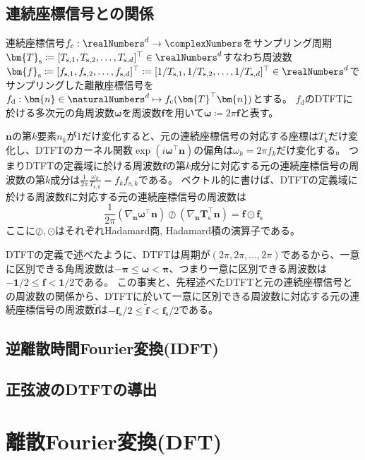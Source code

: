 			\section{連続座標信号との関係}
				連続座標信号$f_\text{c}:\realNumbers^d\to\complexNumbers$をサンプリング周期$\bm{T}_\text{s} \coloneqq [T_{\text{s},1}, T_{\text{s},2}, \dotsc, T_{\text{s},d}]^\top\in\realNumbers^d$すなわち周波数$\bm{f}_\text{s} \coloneqq [f_{\text{s},1}, f_{\text{s},2}, \dotsc, f_{\text{s},d}]^\top \coloneqq [1/T_{\text{s},1}, 1/T_{\text{s},2}, \dotsc, 1/T_{\text{s},d}]^\top\in\realNumbers^d$でサンプリングした離散座標信号を$f_\text{d}: \bm{n}\in\naturalNumbers^d\mapsto f_\text{c}(\bm{T}^\top\bm{n})$とする。
				$f_\text{d}$のDTFTに於ける多次元の角周波数$\bm{\omega}$を周波数$\bm{f}$を用いて$\bm{\omega} \coloneqq 2\pi\bm{f}$と表す。
				\par
				$\bm{n}$の第$k$要素$n_k$が1だけ変化すると、元の連続座標信号の対応する座標は$T_k$だけ変化し、DTFTのカーネル関数$\exp(i\bm{\omega}^\top\bm{n})$の偏角は$\omega_k = 2\pi f_k$だけ変化する。
				つまりDTFTの定義域に於ける周波数$\bm{f}$の第$k$成分に対応する元の連続座標信号の周波数の第$k$成分は$\frac{1}{2\pi}\frac{\omega_k}{T_{\text{s},k}} = f_k f_{\text{s}, k}$である。
				ベクトル的に書けば、DTFTの定義域に於ける周波数$\bm{f}$に対応する元の連続座標信号の周波数は
				\[ \frac{1}{2\pi} \left(\nabla_\bm{n} \bm{\omega}^\top\bm{n}\right) \oslash \left(\nabla_\bm{n} \bm{T}_\text{s}^\top\bm{n}\right) = \bm{f} \odot \bm{f}_\text{s} \]
				ここに$\oslash, \odot$はそれぞれHadamard商, Hadamard積の演算子である。
				\par
				DTFTの定義で述べたように、DTFTは周期が$(2\pi,2\pi,\dotsc,2\pi)$であるから、一意に区別できる角周波数は$-\bm{\pi} \leq \bm{\omega} < \bm{\pi}$、つまり一意に区別できる周波数は$-\bm{1}/2 \leq \bm{f} < \bm{1}/2$である。
				この事実と、先程述べたDTFTと元の連続座標信号との周波数の関係から、DTFTに於いて一意に区別できる周波数に対応する元の連続座標信号の周波数$\tilde{\bm{f}}$は$-\bm{f}_\text{s}/2 \leq \tilde{\bm{f}} < \bm{f}_\text{s}/2$である。
			\section{逆離散時間Fourier変換(IDFT)}
			\section{正弦波のDTFTの導出}
		\chapter{離散Fourier変換(DFT)}

